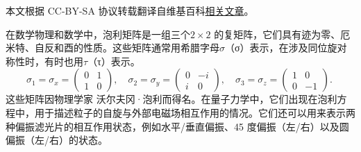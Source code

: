 
本文根据 CC-BY-SA 协议转载翻译自维基百科\href{https://en.wikipedia.org/wiki/Pauli_matrices}{相关文章}。

在数学物理和数学中，泡利矩阵是一组三个$2\times2$ 的复矩阵，它们具有迹为零、厄米特、自反和酉的性质。这些矩阵通常用希腊字母$\sigma$（σ）表示，在涉及同位旋对称性时，有时也用$\tau$（τ）表示。
$$
\sigma_1 = \sigma_x = 
\begin{pmatrix}
0 & 1 \\
1 & 0
\end{pmatrix},
\quad
\sigma_2 = \sigma_y = 
\begin{pmatrix}
0 & -i \\
i & 0
\end{pmatrix},
\quad
\sigma_3 = \sigma_z = 
\begin{pmatrix}
1 & 0 \\
0 & -1
\end{pmatrix}.~
$$
这些矩阵因物理学家 沃尔夫冈·泡利而得名。在量子力学中，它们出现在泡利方程中，用于描述粒子的自旋与外部电磁场相互作用的情况。它们还可以用来表示两种偏振滤光片的相互作用状态，例如水平/垂直偏振、45 度偏振（左/右）以及圆偏振（左/右）的状态。
